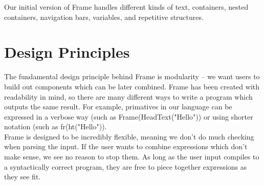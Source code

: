 \documentclass{article}
\begin{document}
Our initial version of Frame handles different kinds of text, containers, nested containers, navigation bars, variables, and repetitive structures.

\section{Design Principles}

The fundamental design principle behind Frame is modularity -- we want users to build out components which can be later combined. Frame has been created with readability in mind, so there are many different ways to write a program which outputs the same result. For example, primatives in our language can be expressed in a verbose way (such as Frame(HeadText("Hello")) or using shorter notation (such as fr(ht("Hello")).\\

Frame is designed to be incredibly flexible, meaning we don't do much checking when parsing the input. If the user wants to combine expressions which don't make sense, we see no reason to stop them. As long as the user input compiles to a syntactically correct program, they are free to piece together expressions as they see fit.\\
\end{document}
